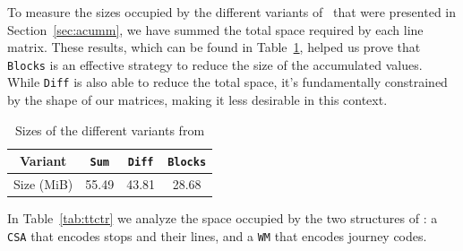     To measure the sizes occupied by the different variants of \acumm~that were presented in Section~\ref{sec:acumm}, we have summed the total space required by each line matrix. These results, which can be found in Table~\ref{tab:acuum}, helped us prove that \texttt{Blocks} is an effective strategy to reduce the size of the accumulated values. While \texttt{Diff} is also able to reduce the total space, it's fundamentally constrained by the shape of our matrices, making it less desirable in this context.
    
    \begin{table}
        \centering
        \caption{Sizes of the different variants from \acumm}
        \label{tab:acuum}
        \begin{tabular}{|c|c|c|c|}
        \hline
            Variant & \texttt{Sum} & \texttt{Diff} & \texttt{Blocks} \\
            \hline
            Size (MiB) & 55.49 & 43.81 & 28.68 \\
        \hline
        \end{tabular}
    \end{table}
    
    In Table~\ref{tab:ttctr} we analyze the space occupied by the two structures of \ttctr: a \texttt{CSA} that encodes stops and their lines, and a \texttt{WM} that encodes journey codes.
    
